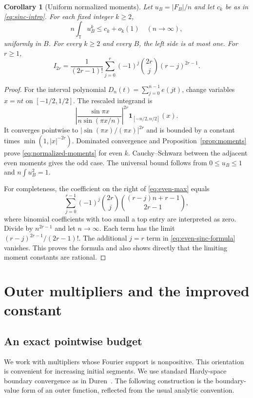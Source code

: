 \documentclass[11pt,reqno]{amsart}
\numberwithin{equation}{section}
\newtheorem{corollary}[theorem]{Corollary}
\theoremstyle{definition}
\theoremstyle{remark}
\newcommand{\T}{\mathbb T}
\newcommand{\one}{\mathbf 1}
\begin{document}
\begin{corollary}[Uniform normalized moments]\label{cor:normalized-moments}
Let $u_B=|F_B|/n$ and let $c_k$ be as in \eqref{eq:sinc-intro}. For each
fixed integer $k\ge2$,
\begin{equation}\label{eq:normalized-moments}
 n\int_\T u_B^k\le c_k+o_k(1)\quad(n\longrightarrow\infty),
\end{equation}
uniformly in $B$. For every $k\ge2$ and every $B$, the left side is at
most one. For $r\ge1$,
\begin{equation}\label{eq:even-sinc-formula}
 I_{2r}=\frac1{(2r-1)!}
 \sum_{j=0}^r(-1)^j\binom{2r}{j}(r-j)^{2r-1}.
\end{equation}
\end{corollary}
\begin{proof}
For the interval polynomial $D_n(t)=\sum_{j=0}^{n-1}e(jt)$, change variables
$x=nt$ on $[-1/2,1/2]$. The rescaled integrand is
\[
 \left|\frac{\sin\pi x}{n\sin(\pi x/n)}\right|^{2r}
 \one_{[-n/2,n/2]}(x).
\]
It converges pointwise to $|\sin(\pi x)/(\pi x)|^{2r}$ and is bounded
by a constant times $\min(1,|x|^{-2r})$. Dominated convergence and
Proposition~\ref{prop:moments} prove \eqref{eq:normalized-moments} for even
$k$. Cauchy--Schwarz between the adjacent even moments gives the odd
case. The universal bound follows from $0\le u_B\le1$ and
$n\int u_B^2=1$.

For completeness, the coefficient on the right of \eqref{eq:even-max}
equals
\[
 \sum_{j=0}^{r-1}(-1)^j\binom{2r}{j}
 \binom{(r-j)n+r-1}{2r-1},
\]
where binomial coefficients with too small a top entry are interpreted
as zero. Divide by $n^{2r-1}$ and let $n\to\infty$. Each term has the
limit $(r-j)^{2r-1}/(2r-1)!$. The additional $j=r$ term in
\eqref{eq:even-sinc-formula} vanishes. This proves the formula and also
shows directly that the limiting moment constants are rational.
\end{proof}

\section{Outer multipliers and the improved constant}\label{sec:constant-proof}

\subsection{An exact pointwise budget}

We work with multipliers whose Fourier support is nonpositive. This
orientation is convenient for increasing initial segments. We use standard
Hardy-space boundary convergence as in Duren~\cite{Duren}. The following
construction is the boundary-value form of an outer function, reflected
from the usual analytic convention.
\end{document}
